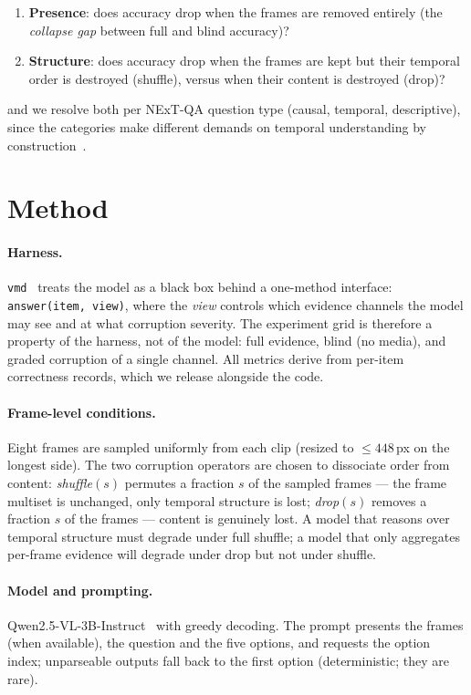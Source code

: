 \documentclass[11pt]{article}
\begin{document}
\begin{enumerate}
  \item \textbf{Presence}: does accuracy drop when the frames are removed
        entirely (the \emph{collapse gap} between full and blind accuracy)?
  \item \textbf{Structure}: does accuracy drop when the frames are kept but
        their temporal order is destroyed (shuffle), versus when their content
        is destroyed (drop)?
\end{enumerate}

\noindent and we resolve both per NExT-QA question type (causal, temporal,
descriptive), since the categories make different demands on temporal
understanding by construction~\citep{xiao2021nextqa}.

\section{Method}

\paragraph{Harness.} \texttt{vmd}~\citep{lahoz2026vmd} treats the model as a
black box behind a one-method interface: \texttt{answer(item, view)}, where the
\emph{view} controls which evidence channels the model may see and at what
corruption severity. The experiment grid is therefore a property of the
harness, not of the model: full evidence, blind (no media), and graded
corruption of a single channel. All metrics derive from per-item correctness
records, which we release alongside the code.

\paragraph{Frame-level conditions.} Eight frames are sampled uniformly from
each clip (resized to $\leq 448$\,px on the longest side). The two corruption
operators are chosen to dissociate order from content:
\emph{shuffle}$(s)$ permutes a fraction $s$ of the sampled frames --- the frame
multiset is unchanged, only temporal structure is lost; \emph{drop}$(s)$
removes a fraction $s$ of the frames --- content is genuinely lost. A model
that reasons over temporal structure must degrade under full shuffle; a model
that only aggregates per-frame evidence will degrade under drop but not under
shuffle.

\paragraph{Model and prompting.} Qwen2.5-VL-3B-Instruct~\citep{bai2025qwen25vl}
with greedy decoding. The prompt presents the frames (when available), the
question and the five options, and requests the option index; unparseable
outputs fall back to the first option (deterministic; they are rare).
\end{document}
